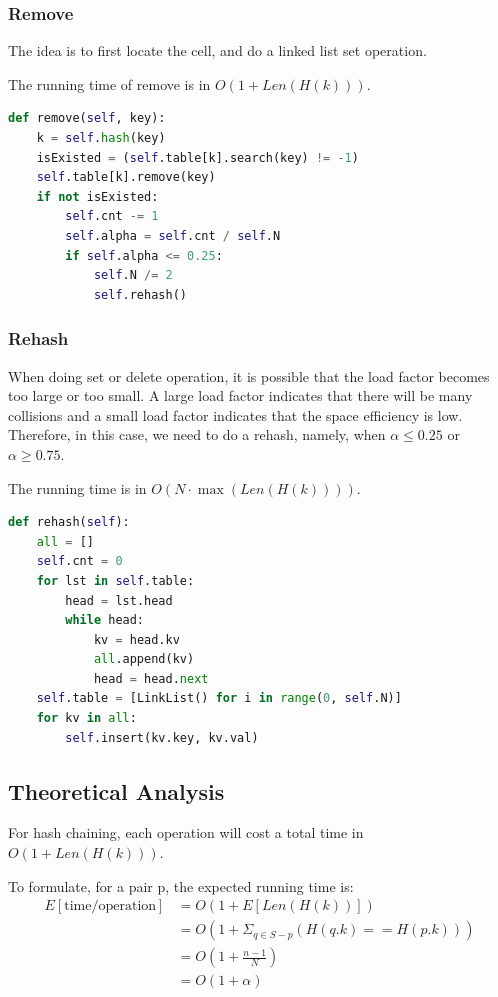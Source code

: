 \documentclass{article}
\begin{document}
\begin{spacing}{1.2}
\subsubsection{Remove}
The idea is to first locate the cell, and do a linked list set operation.

The running time of remove is in $O(1 + Len(H(k)))$.
\begin{lstlisting}[language=Python]
def remove(self, key):
    k = self.hash(key)
    isExisted = (self.table[k].search(key) != -1)
    self.table[k].remove(key)
    if not isExisted:
        self.cnt -= 1
        self.alpha = self.cnt / self.N
        if self.alpha <= 0.25:
            self.N /= 2
            self.rehash()
\end{lstlisting}

\subsubsection{Rehash}
When doing set or delete operation, it is possible that the load factor becomes too large or too small. A large load factor indicates that there will be many collisions and a small load factor indicates that the space efficiency is low. Therefore, in this case, we need to do a rehash, namely, when $\alpha \leq 0.25$ or $\alpha \geq 0.75$.

The running time is in $O(N\cdot\max(Len(H(k))))$.
\begin{lstlisting}[language=Python]
def rehash(self):
    all = []
    self.cnt = 0
    for lst in self.table:
        head = lst.head
        while head:
            kv = head.kv
            all.append(kv)
            head = head.next
    self.table = [LinkList() for i in range(0, self.N)]
    for kv in all:
        self.insert(kv.key, kv.val)
\end{lstlisting}

\subsection{Theoretical Analysis}
For hash chaining, each operation will cost a total time in $O(1 + Len(H(k)))$.

To formulate, for a pair p, the expected running time is:
\begin{align*}
    E[\text{time/operation}] &= O(1 + E[Len(H(k))])\\
    &= O(1 + \Sigma_{q \in S - p}(H(q.k) == H(p.k)))\\
    &= O(1 + \frac{n-1}{N})\\
    &= O(1 + \alpha)
\end{align*}


\end{spacing}
\end{document}
